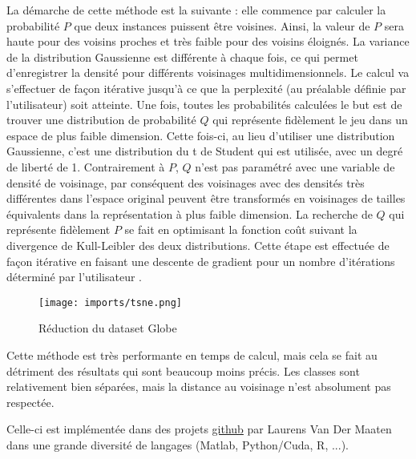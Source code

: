 La démarche de cette méthode est la suivante : elle commence par calculer la  probabilité $P$ que deux instances puissent être voisines. Ainsi, la valeur de $P$ sera haute pour des voisins proches et très faible pour des voisins éloignés.\newline
La variance de la distribution Gaussienne est différente à chaque fois, ce qui permet d'enregistrer la densité pour différents voisinages multidimensionnels.
Le calcul va s’effectuer de façon itérative jusqu’à ce que la perplexité (au préalable définie par l’utilisateur) soit atteinte.
\newline Une fois, toutes les probabilités calculées le but est de trouver une distribution de probabilité $Q$ qui représente fidèlement le jeu dans un espace de plus faible dimension. Cette fois-ci, au lieu d’utiliser une distribution Gaussienne, c’est une distribution du t de Student qui est utilisée, avec un degré de liberté de 1. 
\newline Contrairement à $P$, $Q$ n’est pas paramétré avec une variable de densité de voisinage, par conséquent des voisinages avec des densités très différentes dans l’espace original peuvent être transformés en  voisinages de tailles équivalents dans la représentation à plus faible dimension.
La recherche de $Q$ qui représente fidèlement $P$ se fait en optimisant la fonction coût suivant la divergence de Kull-Leibler des deux distributions. Cette étape est effectuée de façon itérative en faisant une descente de gradient pour un nombre d’itérations déterminé par l’utilisateur \cite{van2008TSNE}.

\begin{center}
    \begin{figure}[ht!]
        \centering
        
        \texttt{[image: imports/tsne.png]}
        
        \caption{Réduction du dataset Globe}
    \end{figure}
\end{center}

Cette méthode est très performante en temps de calcul, mais cela se fait au détriment des résultats qui sont beaucoup moins précis. 
Les classes sont relativement bien séparées, mais la distance au voisinage n'est absolument pas respectée.

Celle-ci est implémentée dans des projets \href{https://lvdmaaten.github.io/tsne/}{github} par Laurens Van Der Maaten dans une grande diversité de langages (Matlab, Python/Cuda, R, ...). 


